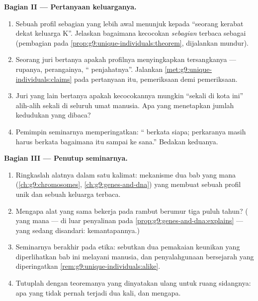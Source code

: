 \begin{problem}
\medskip\noindent\textbf{Bagian II --- Pertanyaan
keluarganya.}
\begin{enumerate}[resume]
  \item Sebuah profil sebagian yang lebih awal menunjuk
        kepada ``seorang kerabat dekat keluarga K''.
        Jelaskan bagaimana kecocokan \emph{sebagian} terbaca
        sebagai  (pembagian pada
        \cref{prop:g9:unique-individuals:theorem},
        dijalankan mundur).
  \item Seorang juri bertanya apakah profilnya menyingkapkan
         tersangkanya --- rupanya, perangainya, ``
        penjahatnya''. Jalankan
        \cref{met:g9:unique-individuals:claims} pada
        pertanyaan itu, pemeriksaan demi pemeriksaan.
  \item Juri yang lain bertanya apakah kecocokannya mungkin
        ``sekali di kota ini'' alih-alih sekali di seluruh
        umat manusia. Apa yang menetapkan jumlah kedudukan
        yang dibaca?
  \item Pemimpin seminarnya memperingatkan: ``
        berkata  siapa; perkaranya masih harus berkata
        bagaimana  itu sampai ke sana.'' Bedakan keduanya.
\end{enumerate}

\medskip\noindent\textbf{Bagian III --- Penutup
seminarnya.}
\begin{enumerate}[resume]
  \item Ringkaslah alatnya dalam satu kalimat: mekanisme dua
        bab yang mana (\cref{ch:g9:chromosomes},
        \cref{ch:g9:genes-and-dna}) yang membuat sebuah
        profil unik dan sebuah keluarga terbaca.
  \item Mengapa alat yang sama bekerja pada rambut berumur
        tiga puluh tahun? (  yang mana --- di luar
        penyalinan pada \cref{prop:g9:genes-and-dna:explains}
        --- yang sedang disandari: kemantapannya.)
  \item Seminarnya berakhir pada etika: sebutkan dua
        pemakaian keunikan yang diperlihatkan bab ini
        melayani manusia, dan penyalahgunaan bersejarah yang
        diperingatkan \cref{rem:g9:unique-individuals:alike}.
  \item Tutuplah dengan teoremanya yang dinyatakan ulang
        untuk ruang sidangnya: apa yang tidak pernah terjadi
        dua kali, dan mengapa.
\end{enumerate}
\end{problem}
